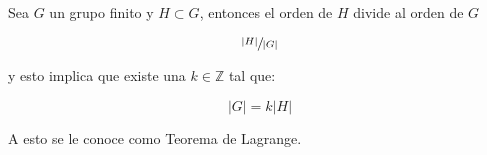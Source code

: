         \begin{teorema}
            Sea $G$ un grupo finito y $H \subset G$, entonces el orden de $H$ divide al orden de $G$

            \begin{equation}
                \sfrac{|H|}{|G|}
            \end{equation}

            y esto implica que existe una $k \in \mathbb{Z}$ tal que:

            \begin{equation}
                |G| = k |H|
            \end{equation}

            A esto se le conoce como Teorema de Lagrange.
        \end{teorema}

